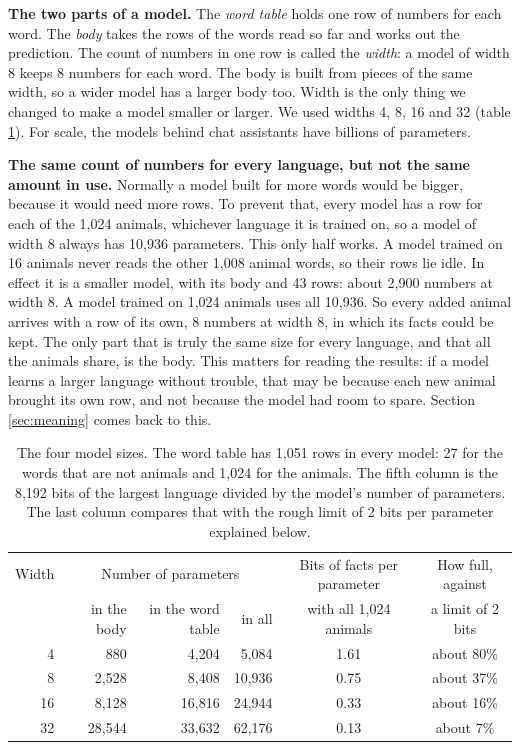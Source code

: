 \textbf{The two parts of a model.} The \emph{word table} holds one row of numbers for each
word. The \emph{body} takes the rows of the words read so far and works out the prediction.
The count of numbers in one row is called the \emph{width}: a model of width 8 keeps 8 numbers
for each word. The body is built from pieces of the same width, so a wider model has a larger
body too. Width is the only thing we changed to make a model smaller or larger. We used widths
4, 8, 16 and 32 (table \ref{tab:sizes}). For scale, the models behind chat assistants have
billions of parameters.

\textbf{The same count of numbers for every language, but not the same amount in use.}
Normally a model built for more words would be bigger, because it would need more rows. To
prevent that, every model has a row for each of the 1,024 animals, whichever language it is
trained on, so a model of width 8 always has 10,936 parameters. This only half works. A model
trained on 16 animals never reads the other 1,008 animal words, so their rows lie idle. In
effect it is a smaller model, with its body and 43 rows: about 2,900 numbers at width 8. A model
trained on 1,024 animals uses all 10,936. So every added animal arrives with a row of its own,
8 numbers at width 8, in which its facts could be kept. The only part that is truly the same
size for every language, and that all the animals share, is the body. This matters for reading
the results: if a model learns a larger language without trouble, that may be because each
new animal brought its own row, and not because the model had room to spare. Section
\ref{sec:meaning} comes back to this.

\begin{table}[H]
\centering\small
\begin{tabular}{@{}rrrrcc@{}}
\toprule
Width & \multicolumn{3}{c}{Number of parameters} & Bits of facts per parameter & How full, against \\
 & in the body & in the word table & in all & with all 1,024 animals & a limit of 2 bits \\
\midrule
4 & 880 & 4,204 & 5,084 & 1.61 & about 80\% \\
8 & 2,528 & 8,408 & 10,936 & 0.75 & about 37\% \\
16 & 8,128 & 16,816 & 24,944 & 0.33 & about 16\% \\
32 & 28,544 & 33,632 & 62,176 & 0.13 & about 7\% \\
\bottomrule
\end{tabular}
\caption{The four model sizes. The word table has 1,051 rows in every model: 27 for the words
that are not animals and 1,024 for the animals. The fifth column is the 8,192 bits of the
largest language divided by the model's number of parameters. The last column compares that
with the rough limit of 2 bits per parameter explained below.}
\label{tab:sizes}
\end{table}

